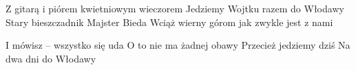 \documentclass[../../../songbook.tex]{subfiles}
\begin{document}
\begin{multicols}{2}
{Z gitarą i piórem kwietniowym wieczorem					\newline
Jedziemy Wojtku razem do Włodawy					\newline	
Stary bieszczadnik Majster Bieda					\newline	
Wciąż wierny górom jak zwykle jest z nami				\newline
	
\-\hspace{1cm} I mówisz – wszystko się uda				\newline
\-\hspace{1cm} O to nie ma żadnej obawy			\newline
\-\hspace{1cm} Przecież jedziemy dziś				\newline
\-\hspace{1cm} Na dwa dni do Włodawy				\newline
	
}
\end{multicols}
\end{document}

